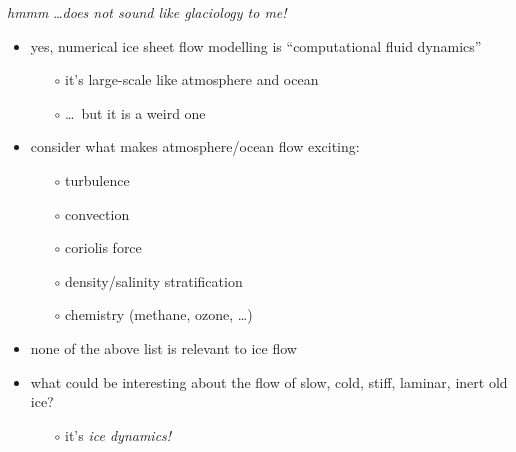 \begin{frame}{\emph{hmmm} \dots \emph{does not sound like glaciology to me!}}

\begin{itemize}
\item \alert{yes}, numerical ice sheet flow modelling is ``computational fluid dynamics''
  \begin{itemize}
  \item[$\circ$] it's large-scale like atmosphere and ocean
  \item[$\circ$] \dots\, but it is a weird one
  \end{itemize}
\item consider what makes atmosphere/ocean flow exciting:
  \begin{itemize}
  \item[$\circ$] turbulence
  \item[$\circ$] convection
  \item[$\circ$] coriolis force
  \item[$\circ$] density/salinity stratification
  \item[$\circ$] chemistry (methane, ozone, \dots)
  \end{itemize}
\item none of the above list is relevant to ice flow
\item what could be interesting about the flow of slow, cold, stiff, laminar, inert old ice?
  \begin{itemize}
  \item[$\circ$] it's \emph{ice dynamics!}
  \end{itemize}
\end{itemize}
\end{frame}


